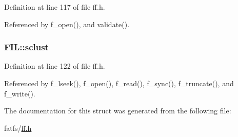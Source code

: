 Definition at line 117 of file ff.\-h.



Referenced by f\-\_\-open(), and validate().

\hypertarget{structFIL_ad308b74c8d6975c6a9c30d90b4124c40}{
\subsubsection[{sclust}]{ F\-I\-L\-::sclust}}\label{structFIL_ad308b74c8d6975c6a9c30d90b4124c40}


Definition at line 122 of file ff.\-h.



Referenced by f\-\_\-lseek(), f\-\_\-open(), f\-\_\-read(), f\-\_\-sync(), f\-\_\-truncate(), and f\-\_\-write().



The documentation for this struct was generated from the following file\-:\begin{DoxyCompactItemize}
\item 
fatfs/\hyperlink{ff_8h}{ff.\-h}\end{DoxyCompactItemize}
